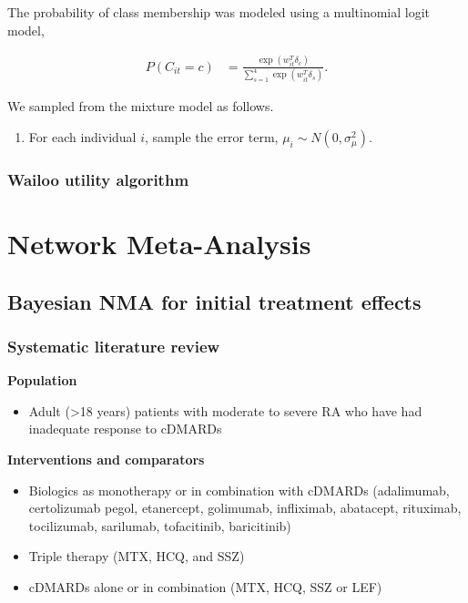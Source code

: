\documentclass[11pt,final,fleqn]{article}\usepackage[]{graphicx}\usepackage[]{color}
\theoremstyle{plain}
\begin{document}
\begin{appendices}
The probability of class membership was modeled using a multinomial logit model,

\begin{align}
P(C_{it} = c) &= \frac{\exp(w_{it}^T\delta_c)}{\sum_{s=1}^{4}\exp(w_{it}^T\delta_s)}.
\end{align}

We sampled from the mixture model as follows.

\begin{enumerate}
\item For each individual $i$, sample the error term, $\mu_{i} \sim N(0, \sigma^2_\mu)$.
\end{enumerate}


\subsubsection{Wailoo utility algorithm}\label{Wailoo-utility}

\section{Network Meta-Analysis}\label{appendix:NMA}

\subsection{Bayesian NMA for initial treatment
effects}\label{sec:tech-nma-initial}

\subsubsection{Systematic literature
review}\label{systematic-literature-review}

\textbf{Population}
\begin{itemize}
\item
  Adult (\textgreater{}18 years) patients with moderate to severe RA who
  have had inadequate response to cDMARDs
\end{itemize}

\textbf{Interventions and comparators}

\begin{itemize}
\item
  Biologics as monotherapy or in combination with cDMARDs (adalimumab,
  certolizumab pegol, etanercept, golimumab, infliximab, abatacept,
  rituximab, tocilizumab, sarilumab, tofacitinib, baricitinib)
\item
  Triple therapy (MTX, HCQ, and SSZ)
\item
  cDMARDs alone or in combination (MTX, HCQ, SSZ or LEF)
\end{itemize}


\end{appendices}
\end{document}
